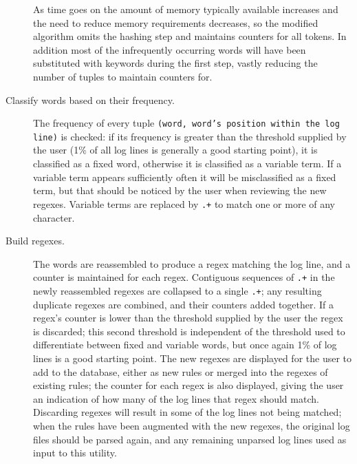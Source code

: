 \begin{description}
        As time goes on the amount of memory typically available increases
        and the need to reduce memory requirements decreases, so the
        modified algorithm omits the hashing step and maintains counters
        for all tokens.  In addition most of the infrequently occurring
        words will have been substituted with keywords during the first
        step, vastly reducing the number of tuples to maintain counters
        for.

    \item [Classify words based on their frequency.]  The frequency of
        every tuple \texttt{(word, word's position within the log line)} is
        checked: if its frequency is greater than the threshold supplied by
        the user (1\% of all log lines is generally a good starting point),
        it is classified as a fixed word, otherwise it is classified as a
        variable term.  If a variable term appears sufficiently often it
        will be misclassified as a fixed term, but that should be noticed
        by the user when reviewing the new regexes.  Variable terms are
        replaced by \texttt{.+} to match one or more of any character.

    \item [Build regexes.]  The words are reassembled to produce a regex
        matching the log line, and a counter is maintained for each regex.
        Contiguous sequences of \texttt{.+} in the newly reassembled
        regexes are collapsed to a single \texttt{.+}; any resulting
        duplicate regexes are combined, and their counters added together.
        If a regex's counter is lower than the threshold supplied by the
        user the regex is discarded; this second threshold is independent
        of the threshold used to differentiate between fixed and variable
        words, but once again 1\% of log lines is a good starting point.
        The new regexes are displayed for the user to add to the database,
        either as new rules or merged into the regexes of existing rules;
        the counter for each regex is also displayed, giving the user an
        indication of how many of the log lines that regex should match.
        Discarding regexes will result in some of the log lines not being
        matched; when the rules have been augmented with the new regexes,
        the original log files should be parsed again, and any remaining
        unparsed log lines used as input to this utility.

\end{description}

